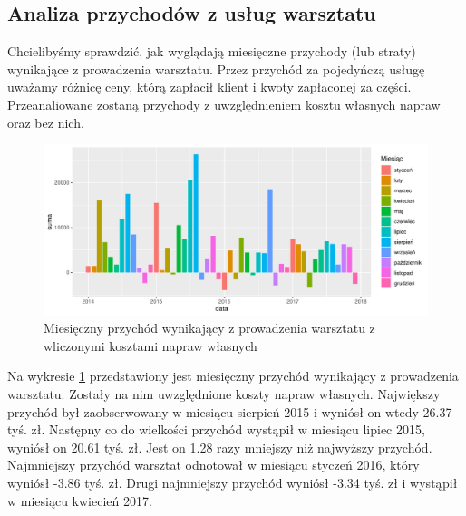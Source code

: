 \documentclass{article}\usepackage[]{graphicx}\usepackage[]{xcolor}
\makeatletter
\def\maxwidth{ %
  \ifdim\Gin@nat@width>\linewidth
    \linewidth
  \else
    \Gin@nat@width
  \fi
}
\newenvironment{knitrout}{}{} %
\makeatother
\begin{document}
\subsection{Analiza przychodów z usług warsztatu}

Chcielibyśmy sprawdzić, jak wyglądają miesięczne przychody (lub straty) wynikające z prowadzenia warsztatu. Przez przychód za pojedyńczą usługę uważamy różnicę ceny, którą zapłacił klient i kwoty zapłaconej za części. Przeanaliowane zostaną przychody z uwzględnieniem kosztu własnych napraw oraz bez nich.

\begin{knitrout}
\color{fgcolor}\begin{figure}[H]

{\centering \includegraphics[width=\maxwidth]{figure/fig_uslugi-1} 

}

\caption[Miesięczny przychód wynikający z prowadzenia warsztatu z wliczonymi kosztami napraw własnych]{Miesięczny przychód wynikający z prowadzenia warsztatu z wliczonymi kosztami napraw własnych}\label{fig:fig_uslugi}
\end{figure}

\end{knitrout}

Na wykresie \ref{fig:fig_uslugi} przedstawiony jest miesięczny przychód wynikający z prowadzenia warsztatu. Zostały na nim uwzględnione koszty napraw własnych. 
Największy przychód był zaobserwowany w miesiącu sierpień 2015 i wyniósł on wtedy 26.37 tyś. zł.
Następny co do wielkości przychód wystąpił w miesiącu lipiec 2015, wyniósł on 20.61 tyś. zł. Jest on 1.28 razy mniejszy niż najwyższy przychód.
Najmniejszy przychód warsztat odnotował w miesiącu styczeń 2016, który wyniósł -3.86 tyś. zł. 
Drugi najmniejszy przychód wyniósł -3.34 tyś. zł i wystąpił w miesiącu kwiecień 2017.
\end{document}
